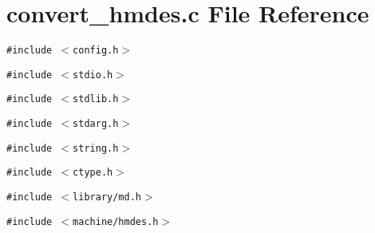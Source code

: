 \section{convert\_\-hmdes.c File Reference}
\label{convert__hmdes_8c}
{\tt \#include $<$config.h$>$}\par
{\tt \#include $<$stdio.h$>$}\par
{\tt \#include $<$stdlib.h$>$}\par
{\tt \#include $<$stdarg.h$>$}\par
{\tt \#include $<$string.h$>$}\par
{\tt \#include $<$ctype.h$>$}\par
{\tt \#include $<$library/md.h$>$}\par
{\tt \#include $<$machine/hmdes.h$>$}\par

